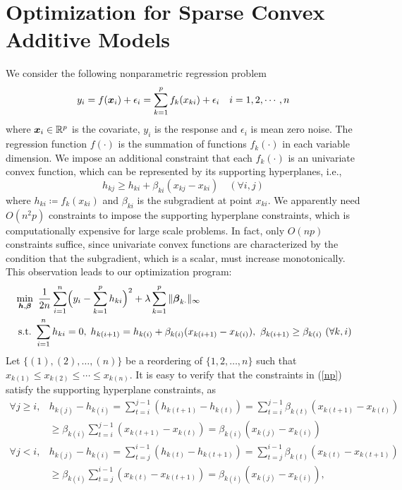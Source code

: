 \section{Optimization for Sparse Convex Additive Models}

We consider the following nonparametric regression problem
\begin{equation}\nonumber
          y_{i} = f(\boldsymbol{x}_{i}) + \epsilon_{i} = \sum_{k=1}^{p}f_{k}(x_{ki}) + \epsilon_{i} \quad i=1,2,\cdots,n
\end{equation}
where $\boldsymbol{x}_{i}\in\mathbb{R}^{p}$ is the covariate, $y_{i}$ is the
response and $\epsilon_{i}$ is mean zero noise. The regression function $f(\cdot)$ is the summation of 
functions $f_{k}(\cdot)$ in each variable dimension.  
We impose an additional constraint that each $f_{k}(\cdot)$ is 
an univariate convex function, which can be represented by its supporting hyperplanes, i.e.,
\begin{equation}\label{hyper}
      h_{kj} \geq h_{ki} + \beta_{ki}(x_{kj}-x_{ki}) \quad (\forall i,j)
\end{equation}
where $h_{ki}\coloneqq f_{k}(x_{ki})$ and $\beta_{ki}$ is the
subgradient at point $x_{ki}$. We apparently need $O(n^2 p)$ constraints to
impose the supporting hyperplane constraints, which is computationally
expensive for large scale problems.  In fact, only $O(np)$
constraints suffice, since univariate convex functions are
characterized by the condition that the subgradient, which is a scalar, must
increase monotonically. This observation leads to our optimization
program:
\begin{equation}\begin{split}\label{np}
       &\min_{\bds{h},\bds{\beta}} \ \frac{1}{2n}\sum_{i=1}^{n}\Bigl(y_{i}-\sum_{k=1}^{p}h_{ki}\Bigr)^{2} + \lambda\sum_{k=1}^{p}\|\bds{\beta}_{k\cdot}\|_{\infty} \\
       &\ \textrm{s.t.} \ \sum_{i=1}^{n}h_{ki}=0,\; h_{k(i+1)} = h_{k(i)} + \beta_{k(i)}(x_{k(i+1)}-x_{k(i)}), \ \beta_{k(i+1)} \geq \beta_{k(i)} \ (\forall k, i)
\end{split}\end{equation}
Let $\{(1),(2),\ldots,(n)\}$ be a reordering of $\{1,2,\ldots,n\}$ such that $x_{k(1)}\leq{}x_{k(2)}\leq\cdots\leq{}x_{k(n)}$.  It is easy to verify that the constraints in (\ref{np}) satisfy the supporting hyperplane constraints, as
\begin{eqnarray}
  \nonumber \forall j\geq{}i, &h_{k(j)}-h_{k(i)}  = \sum\limits_{t=i}^{j-1}(h_{k(t+1)}-h_{k(t)}) = \sum\limits_{t=i}^{j-1}\beta_{k(t)}(x_{k(t+1)}-x_{k(t)})\\ \nonumber
                                                                             & \geq \beta_{k(i)}\sum\limits_{t=i}^{j-1}(x_{k(t+1)}-x_{k(t)}) = \beta_{k(i)}(x_{k(j)}-x_{k(i)}) \\
  \nonumber \forall j<i,         &h_{k(j)}-h_{k(i)} = \sum\limits_{t=j}^{i-1}(h_{k(t)}-h_{k(t+1)}) = \sum\limits_{t=j}^{i-1}\beta_{k(t)}(x_{k(t)}-x_{k(t+1)}) \\ \nonumber
                                                                             & \geq \beta_{k(i)}\sum\limits_{t=j}^{i-1}(x_{k(t)}-x_{k(t+1)}) = \beta_{k(i)}(x_{k(j)}-x_{k(i)}), 
\end{eqnarray}
